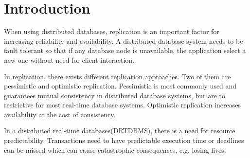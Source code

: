 \section{Introduction}
\label{sec:intro}

When using distributed databases, replication is an important factor for increasing reliability and availability. A distributed database system needs to be fault tolerant so that if any database node is unavailable, the application select a new one without need for client interaction. 

In replication, there exists different replication approaches. Two of them are pessimistic and optimistic replication. Pessimistic is most commonly used and guarantees mutual consistency in distributed database systems, but are to restrictive for most real-time database systems. Optimistic replication increases availability at the cost of consistency. 

In a distributed real-time databases(DRTDBMS), there is a need for resource predictability. Transactions need to have predictable execution time or deadlines can be missed which can cause catastrophic consequences, e.g. losing lives.